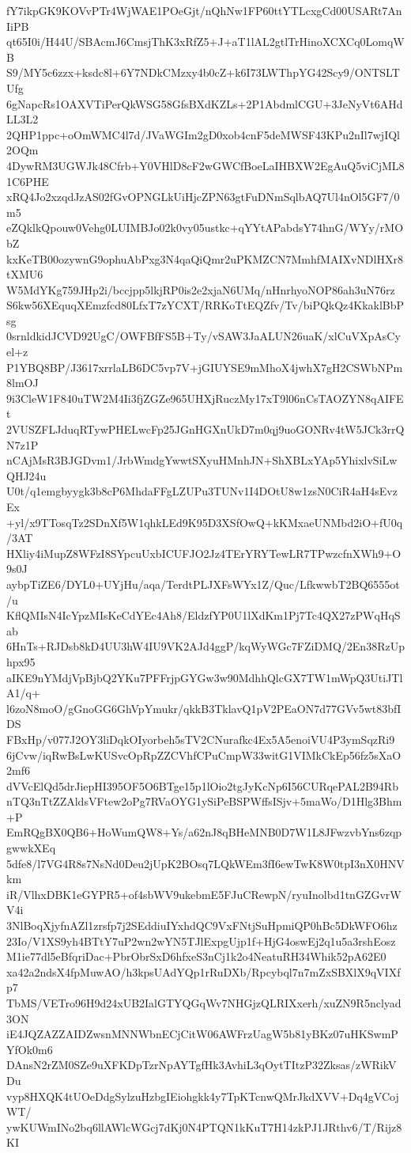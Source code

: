 fY7ikpGK9KOVvPTr4WjWAE1POeGjt/nQhNw1FP60ttYTLcxgCd00USARt7AnIiPB
qt65I0i/H44U/SBAcmJ6CmsjThK3xRfZ5+J+aT1lAL2gtlTrHinoXCXCq0LomqWB
S9/MY5c6zzx+ksdc8l+6Y7NDkCMzxy4b0cZ+k6I73LWThpYG42Scy9/ONTSLTUfg
6gNapcRs1OAXVTiPerQkWSG58GfsBXdKZLs+2P1AbdmlCGU+3JeNyVt6AHdLL3L2
2QHP1ppc+oOmWMC4l7d/JVaWGIm2gD0xob4cnF5deMWSF43KPu2nIl7wjIQl2OQm
4DywRM3UGWJk48Cfrb+Y0VHlD8cF2wGWCfBoeLaIHBXW2EgAuQ5viCjML81C6PHE
xRQ4Jo2xzqdJzAS02fGvOPNGLkUiHjcZPN63gtFuDNmSqlbAQ7Ul4nOl5GF7/0m5
eZQklkQpouw0Vehg0LUIMBJo02k0vy05ustkc+qYYtAPabdsY74hnG/WYy/rMObZ
kxKeTB00ozywnG9ophuAbPxg3N4qaQiQmr2uPKMZCN7MmhfMAIXvNDlHXr8tXMU6
W5MdYKg759JHp2i/bccjpp5lkjRP0is2e2xjaN6UMq/nHnrhyoNOP86ah3uN76rz
S6kw56XEquqXEmzfcd80LfxT7zYCXT/RRKoTtEQZfv/Tv/biPQkQz4KkaklBbPsg
0srnldkidJCVD92UgC/OWFBfFS5B+Ty/vSAW3JaALUN26uaK/xlCuVXpAsCyel+z
P1YBQ8BP/J3617xrrlaLB6DC5vp7V+jGIUYSE9mMhoX4jwhX7gH2CSWbNPm8lmOJ
9i3CleW1F840uTW2M4Ii3fjZGZe965UHXjRuczMy17xT9l06nCsTAOZYN8qAIFEt
2VUSZFLJduqRTywPHELwcFp25JGnHGXnUkD7m0qj9uoGONRv4tW5JCk3rrQN7z1P
nCAjMsR3BJGDvm1/JrbWmdgYwwtSXyuHMnhJN+ShXBLxYAp5YhixlvSiLwQHJ24u
U0t/q1emgbyygk3b8cP6MhdaFFgLZUPu3TUNv1I4DOtU8w1zsN0CiR4aH4sEvzEx
+yl/x9TTosqTz2SDnXf5W1qhkLEd9K95D3XSfOwQ+kKMxaeUNMbd2iO+fU0q/3AT
HXliy4iMupZ8WFzI8SYpcuUxbICUFJO2Jz4TErYRYTewLR7TPwzcfnXWh9+O9s0J
aybpTiZE6/DYL0+UYjHu/aqa/TerdtPLJXFsWYx1Z/Quc/LfkwwbT2BQ6555ot/u
KflQMIsN4IcYpzMIsKeCdYEc4Ah8/EldzfYP0U1lXdKm1Pj7Tc4QX27zPWqHqSab
6HnTs+RJDsb8kD4UU3hW4IU9VK2AJd4ggP/kqWyWGc7FZiDMQ/2En38RzUphpx95
aIKE9nYMdjVpBjbQ2YKu7PFFrjpGYGw3w90MdhhQlcGX7TW1mWpQ3UtiJTlA1/q+
l6zoN8moO/gGnoGG6GhVpYmukr/qkkB3TklavQ1pV2PEaON7d77GVv5wt83bfIDS
FBxHp/v077J2OY3liDqkOIyorbeh5sTV2CNurafkc4Ex5A5enoiVU4P3ymSqzRi9
6jCvw/iqRwBsLwKUSvcOpRpZZCVhfCPuCmpW33witG1VIMkCkEp56fz5sXaO2mf6
dVVcElQd5drJiepHI395OF5O6BTge15p1lOio2tgJyKcNp6I56CURqePAL2B94Rb
nTQ3nTtZZAldsVFtew2oPg7RVaOYG1ySiPeBSPWffsISjv+5maWo/D1Hlg3Bhm+P
EmRQgBX0QB6+HoWumQW8+Ys/a62nJ8qBHeMNB0D7W1L8JFwzvbYns6zqpgwwkXEq
5dfe8/l7VG4R8s7NsNd0Deu2jUpK2BOsq7LQkWEm3fI6ewTwK8W0tpI3nX0HNVkm
iR/VlhxDBK1eGYPR5+of4sbWV9ukebmE5FJuCRewpN/ryuInolbd1tnGZGvrWV4i
3NlBoqXjyfnAZl1zrsfp7j2SEddiuIYxhdQC9VxFNtjSuHpmiQP0hBc5DkWFO6hz
23Io/V1XS9yh4BTtY7uP2wn2wYN5TJlExpgUjp1f+HjG4oswEj2q1u5a3rshEosz
M1ie77dl5eBfqriDac+PbrObrSxD6hfxeS3nCj1k2o4NeatuRH34Whik52pA62E0
xa42a2ndsX4fpMuwAO/h3kpsUAdYQp1rRuDXb/Rpcybql7n7mZxSBXlX9qVIXfp7
TbMS/VETro96H9d24xUB2IalGTYQGqWv7NHGjzQLRIXxerh/xuZN9R5nclyad3ON
iE4JQZAZZAIDZwsnMNNWbnECjCitW06AWFrzUagW5b81yBKz07uHKSwmPYfOk0m6
DAnsN2rZM0SZe9uXFKDpTzrNpAYTgfHk3AvhiL3qOytTItzP32Zksas/zWRikVDu
vyp8HXQK4tUOeDdgSylzuHzbgIEiohgkk4y7TpKTcnwQMrJkdXVV+Dq4gVCojWT/
ywKUWmINo2bq6llAWlcWGcj7dKj0N4PTQN1kKuT7H14zkPJ1JRthv6/T/Rijz8KI

